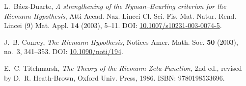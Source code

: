 \documentclass[11pt]{article}
\theoremstyle{remark}
\begin{document}
\begin{thebibliography}{9}

L.~B\'aez-Duarte,
\emph{A strengthening of the Nyman--Beurling criterion for the Riemann Hypothesis},
Atti Accad. Naz. Lincei Cl. Sci. Fis. Mat. Natur. Rend. Lincei (9) Mat. Appl. \textbf{14} (2003), 5--11. 
DOI: \href{https://doi.org/10.1007/s10231-003-0074-5}{10.1007/s10231-003-0074-5}.

J.~B. Conrey,
\emph{The Riemann Hypothesis},
Notices Amer. Math. Soc. \textbf{50} (2003), no.~3, 341--353. 
DOI: \href{https://doi.org/10.1090/noti/194}{10.1090/noti/194}.

E.~C. Titchmarsh,
\emph{The Theory of the Riemann Zeta-Function}, 2nd ed.,
revised by D.~R. Heath-Brown, Oxford Univ. Press, 1986.
ISBN: 9780198533696.

\end{thebibliography}
\end{document}
